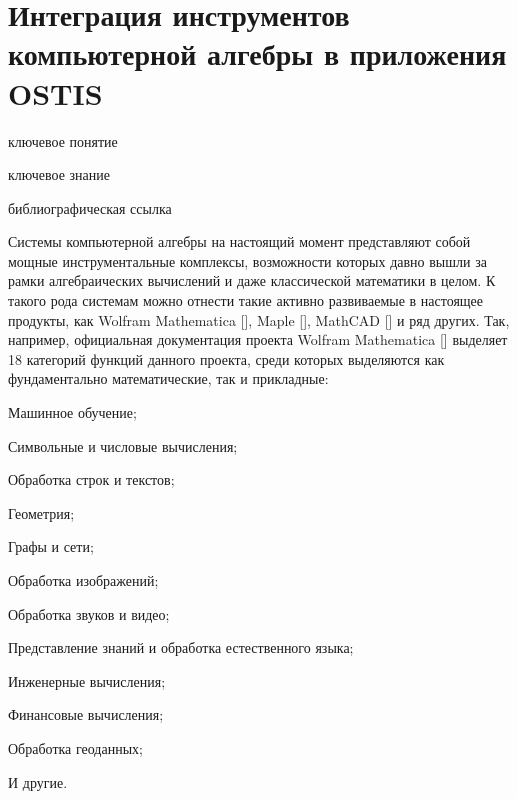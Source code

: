 \newpage

\section{Интеграция инструментов компьютерной алгебры в приложения OSTIS}
{\label{sec_integration_algebra}} 

\begin{SCn}

    \bigskip
    
    \begin{scnrelfromlist}{ключевое понятие}
    \end{scnrelfromlist}
    
    \bigskip
    
    \begin{scnrelfromlist}{ключевое знание}
    \end{scnrelfromlist}
    
    \bigskip
    
    \begin{scnrelfromlist}{библиографическая ссылка}
    \end{scnrelfromlist}
    
    \end{SCn}

Системы компьютерной алгебры на настоящий момент представляют собой мощные инструментальные комплексы, возможности которых давно вышли за рамки алгебраических вычислений и даже классической математики в целом. К такого рода системам можно отнести такие активно развиваемые в настоящее продукты, как Wolfram Mathematica [], Maple [], MathCAD [] и ряд других. Так, например, официальная документация проекта Wolfram Mathematica [] выделяет 18 категорий функций данного проекта, среди которых выделяются как фундаментально математические, так и прикладные:
\begin{textitemize}
	\item Машинное обучение;
	\item Символьные и числовые вычисления;
	\item Обработка строк и текстов;
	\item Геометрия;
	\item Графы и сети;
	\item Обработка изображений;
	\item Обработка звуков и видео;	
	\item Представление знаний и обработка естественного языка;	
	\item Инженерные вычисления;
	\item Финансовые вычисления;
	\item Обработка геоданных;	
	\item И другие.
\end{textitemize}


